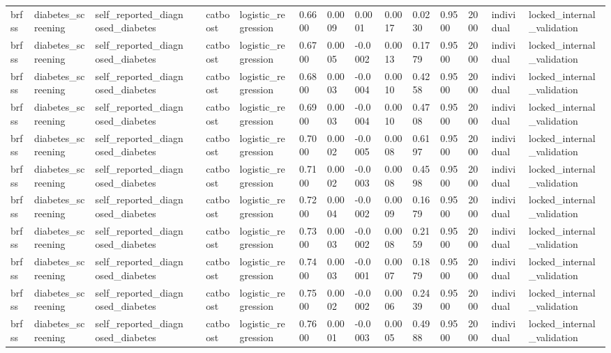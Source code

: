 \begin{tabular}{lllllllllllllll}
brfss & diabetes\_screening & self\_reported\_diagnosed\_diabetes &  & catboost & logistic\_regression & 0.6600 & 0.0009 & 0.0001 & 0.0017 & 0.0230 & 0.9500 & 2000 & individual & locked\_internal\_validation \\
brfss & diabetes\_screening & self\_reported\_diagnosed\_diabetes &  & catboost & logistic\_regression & 0.6700 & 0.0005 & -0.0002 & 0.0013 & 0.1779 & 0.9500 & 2000 & individual & locked\_internal\_validation \\
brfss & diabetes\_screening & self\_reported\_diagnosed\_diabetes &  & catboost & logistic\_regression & 0.6800 & 0.0003 & -0.0004 & 0.0010 & 0.4258 & 0.9500 & 2000 & individual & locked\_internal\_validation \\
brfss & diabetes\_screening & self\_reported\_diagnosed\_diabetes &  & catboost & logistic\_regression & 0.6900 & 0.0003 & -0.0004 & 0.0010 & 0.4708 & 0.9500 & 2000 & individual & locked\_internal\_validation \\
brfss & diabetes\_screening & self\_reported\_diagnosed\_diabetes &  & catboost & logistic\_regression & 0.7000 & 0.0002 & -0.0005 & 0.0008 & 0.6197 & 0.9500 & 2000 & individual & locked\_internal\_validation \\
brfss & diabetes\_screening & self\_reported\_diagnosed\_diabetes &  & catboost & logistic\_regression & 0.7100 & 0.0002 & -0.0003 & 0.0008 & 0.4598 & 0.9500 & 2000 & individual & locked\_internal\_validation \\
brfss & diabetes\_screening & self\_reported\_diagnosed\_diabetes &  & catboost & logistic\_regression & 0.7200 & 0.0004 & -0.0002 & 0.0009 & 0.1679 & 0.9500 & 2000 & individual & locked\_internal\_validation \\
brfss & diabetes\_screening & self\_reported\_diagnosed\_diabetes &  & catboost & logistic\_regression & 0.7300 & 0.0003 & -0.0002 & 0.0008 & 0.2159 & 0.9500 & 2000 & individual & locked\_internal\_validation \\
brfss & diabetes\_screening & self\_reported\_diagnosed\_diabetes &  & catboost & logistic\_regression & 0.7400 & 0.0003 & -0.0001 & 0.0007 & 0.1879 & 0.9500 & 2000 & individual & locked\_internal\_validation \\
brfss & diabetes\_screening & self\_reported\_diagnosed\_diabetes &  & catboost & logistic\_regression & 0.7500 & 0.0002 & -0.0002 & 0.0006 & 0.2439 & 0.9500 & 2000 & individual & locked\_internal\_validation \\
brfss & diabetes\_screening & self\_reported\_diagnosed\_diabetes &  & catboost & logistic\_regression & 0.7600 & 0.0001 & -0.0003 & 0.0005 & 0.4988 & 0.9500 & 2000 & individual & locked\_internal\_validation \\

\end{tabular}
